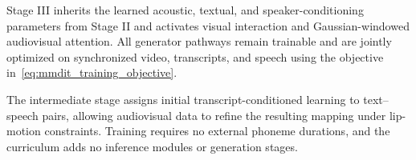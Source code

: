 Stage III inherits the learned acoustic, textual, and speaker-conditioning parameters from Stage II and activates visual interaction and Gaussian-windowed audiovisual attention. All generator pathways remain trainable and are jointly optimized on synchronized video, transcripts, and speech using the objective in~\eqref{eq:mmdit_training_objective}.

The intermediate stage assigns initial transcript-conditioned learning to text--speech pairs, allowing audiovisual data to refine the resulting mapping under lip-motion constraints. Training requires no external phoneme durations, and the curriculum adds no inference modules or generation stages.
